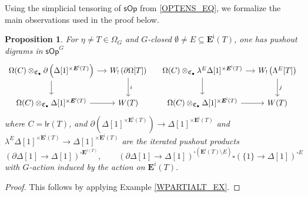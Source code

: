 \documentclass[a4paper,10pt
,draft
]{article}%
\numberwithin{equation}{section}
\numberwithin{figure}{section}
\newtheorem{proposition}[equation]{Proposition}%
\theoremstyle{definition} %
\newcommand{\sOp}{\ensuremath{\mathsf{sOp}}}%
\newcommand{\1}{\ensuremath{\mathbbm 1}}%
\begin{document}
Using the simplicial tensoring of $\sOp$ from \eqref{OPTENS_EQ},
we formalize the main observations used in the proof \cite[Prop. 4.5]{CM13b} below.
\begin{proposition}
      \label{WLEFTQPUSH PROP}
      For $\eta \neq T \in \Omega_G$
      and $G$-closed $\emptyset \neq E \subseteq \boldsymbol{E}^{\mathsf{i}}(T)$,
      one has pushout digrams in $\sOp^G$
      \begin{equation}\label{WLEFTQPUSH_EQ}
            \begin{tikzcd}[column sep = small]
                  \Omega(C) \otimes_{\mathfrak C_\bullet}
                  \partial \left(\Delta[1]^{\times \boldsymbol{E}^{\mathsf{i}}(T)}\right)
                  \ar{r} \ar{d}
                  &
                  W_! \left(\partial \Omega[T]\right) 
                  \arrow[d, "i"]
                  & %
                  \Omega(C) \otimes_{\mathfrak C_\bullet}
                  \lambda^E \Delta[1]^{\times \boldsymbol{E}^{\mathsf{i}}(T)}
                  \ar{r} \ar{d}
                  &
                  W_! \left(\Lambda^E[T]\right) 
                  \arrow[d, "j"]
                  \\
                  \Omega(C) \otimes_{\mathfrak C_\bullet}
                  \Delta[1]^{\times \boldsymbol{E}^{\mathsf{i}}(T)}
                  \ar{r}
                  &
                  W(T)
                  & %
                  \Omega(C) \otimes_{\mathfrak C_\bullet}
                  \Delta[1]^{\times \boldsymbol{E}^{\mathsf{i}}(T)}
                  \ar{r}
                  &
                  W(T)
            \end{tikzcd}
      \end{equation}
      where
      $C = \mathsf{lr}(T)$, and
      $\partial \left(\Delta[1]^{\times \boldsymbol{E}^{\mathsf{i}}(T)}\right)
      \to
      \Delta[1]^{\times \boldsymbol{E}^{\mathsf{i}}(T)}$
      and
      $\lambda^E \Delta[1]^{\times \boldsymbol{E}^{\mathsf{i}}(T)}
      \to \Delta[1]^{\times \boldsymbol{E}^{\mathsf{i}}(T)}$
      are the iterated pushout products
      \[
            \left(
                  \partial\Delta[1] \to \Delta[1]
            \right)^{\square \boldsymbol E^{i(T)}},
            \qquad
            \left(
                  \partial \Delta[1] \to \Delta[1]
            \right)^{\square (\boldsymbol{E}^{\mathsf{i}}(T) \setminus E)}
            \square
            \left(
                  \{1\} \to \Delta[1]
            \right)^{\square E}
      \]
      with $G$-action induced by the action on $\boldsymbol{E}^i(T)$.
\end{proposition}
\begin{proof}
      This follows by applying Example \ref{WPARTIALT_EX}.
\end{proof}
\end{document}
